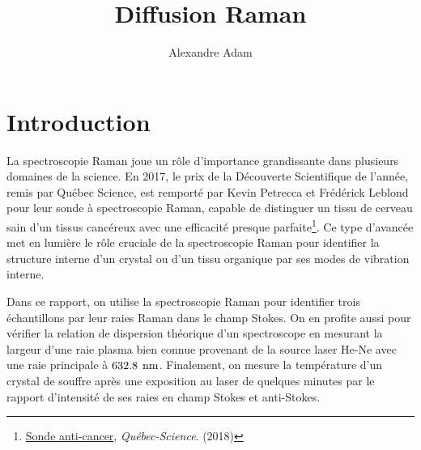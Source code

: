 \documentclass[10pt,letterpaper,twocolumn]{article}
\title{\vspace{-10mm}\Large
Diffusion Raman %
\vspace{-4mm}}
\author{\large
Alexandre Adam
}
\date{\vspace{-8mm}}
\newcommand{\s}{\hspace{0.1cm}}
\newcommand{\unit}[1]{\hspace{0.15cm}\text{#1}}
\begin{document}
\twocolumn[
\maketitle
\begin{onecolabstract} %
	Nous déterminons la nature chimique de trois échantillons à partir de leur spectre Raman dans le champ Stokes. On trouve une raie à $788.0\pm 2\unit{cm}^{-1}$ pour le premier échantillon correspondant au polytope 6H-\ce{SiC}. Les pics $307\pm 5\unit{cm}^{-1}$ et $351 \pm 5\unit{cm}^{-1}$ apparaissent dans le spectre de l'échantillon 2, indiquant la présence de \ce{InP}. Le pic $230 \pm 2\unit{cm}^{-1}$ est observé pour l'échantillon 3, indiquant un crystal de \ce{TiS2}. Nous vérifions aussi la loi de dispersion du spectroscope utilisé en laboratoire, et trouvons que la résolution expérimentale est plus basse que la résolution idéale. Finalement, on mesure la température du souffre après quelques minutes d'expositions au laser comme étant $T = 3.3 \pm 2\s\s 10^2K$, une augmentation de quelques dizaines de degrés par rapport à la température ambiante.
\vspace{4mm} %
\end{onecolabstract}
]

\section{Introduction}\label{intro} %
La spectroscopie Raman joue un rôle d'importance grandissante dans plusieurs domaines de la science. En 2017, le prix de la Découverte Scientifique de l'année, remis par Québec Science, est remporté par Kevin Petrecca et Frédérick Leblond pour leur sonde à spectroscopie Raman, capable de distinguer un tissu de cerveau sain d'un tissus cancéreux avec une efficacité presque parfaite\footnote{\href{https://www.quebecscience.qc.ca/sciences/les-10-decouvertes-de-2017/2-sonde-anti-cancer/}{Sonde anti-cancer}, \textit{Québec-Science}. (2018)}. Ce type d'avancée met en lumière le rôle cruciale de la spectroscopie Raman pour identifier la structure interne d'un crystal ou d'un tissu organique par ses modes de vibration interne. \par
Dans ce rapport, on utilise la spectroscopie Raman pour identifier trois échantillons par leur raies Raman dans le champ Stokes. On en profite aussi pour vérifier la relation de dispersion théorique d'un spectroscope en mesurant la largeur d'une raie plasma bien connue provenant de la source laser He-Ne avec une raie principale à $632.8\unit{nm}$. Finalement, on mesure la température d'un crystal de souffre après une exposition au laser de quelques minutes par le rapport d'intensité de ses raies en champ Stokes et anti-Stokes.
\end{document}
